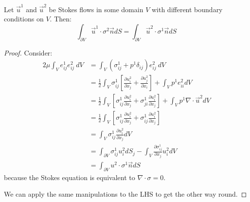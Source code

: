 \documentclass[../Main.tex]{subfiles}
\begin{document}
\begin{theorem}
    Let $\vec{u}^1$ and $\vec{u}^2$ be Stokes flows in some domain $V$ with different boundary conditions on $V$. Then:
    \begin{equation}
        \int_{\partial V} \vec{u}^1 \cdot \sigma^2 \vec{n} dS = \int_{\partial V} \vec{u}^2 \cdot \sigma^1 \vec{n} dS
        \label{eqnReciprocal}
    \end{equation}
    \label{thmReciprocal}
\end{theorem}
\begin{proof}
    Consider:
    \begin{align*}
        2\mu \int_V e^1_{ij} e^2_{ij}~dV &= \int_V \left(\sigma^1_{ij} + p^1 \delta_{ij}\right) e^2_{ij}~dV \\
        &= \frac12 \int_V \sigma^1_{ij} \left[\frac{\partial u^2_i}{\partial x_j} + \frac{\partial u^2_j}{\partial x_i}\right] + \int_V p^1 e^2_{ii} dV \\
        &= \frac12 \int_V \left[\sigma^1_{ij} \frac{\partial u^2_i}{\partial x_j} + \sigma^1_{ji}\frac{\partial u^2_i}{\partial x_j}\right] + \int_V p^1 \nabla \cdot \vec{u}^2 dV \\
        &= \frac12 \int_V \left[\sigma^1_{ij} \frac{\partial u^2_i}{\partial x_j} + \sigma^1_{ij}\frac{\partial u^2_i}{\partial x_j}\right] \\
        &= \int_V \sigma^1_{ij} \frac{\partial u^2_i}{\partial x_j} dV \\
        &= \int_{\partial V} \sigma^1_{ij} u^2_i dS_j - \int_{V} \frac{\partial \sigma^1_{ij}}{\partial x_j} u^2_i dV \\
        &= \int_{\partial V} u^2\cdot \sigma^1 \vec{n}dS
    \end{align*}
    because the Stokes equation is equivalent to $\nabla \cdot \sigma = 0$.
    
    We can apply the same manipulations to the LHS to get the other way round.
\end{proof}
\end{document}
